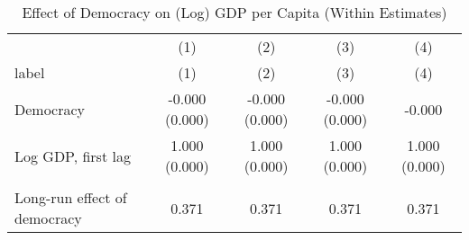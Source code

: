 \begin{table}[!h]
\centering
\caption{\label{tab:tab:fe_main}Effect of Democracy on (Log) GDP per Capita (Within Estimates)}
\centering
\begin{tabular}[t]{lcccc}
\toprule
\multicolumn{1}{c}{ } & \multicolumn{1}{c}{(1)} & \multicolumn{1}{c}{(2)} & \multicolumn{1}{c}{(3)} & \multicolumn{1}{c}{(4)} \\
\cmidrule(l{3pt}r{3pt}){2-2} \cmidrule(l{3pt}r{3pt}){3-3} \cmidrule(l{3pt}r{3pt}){4-4} \cmidrule(l{3pt}r{3pt}){5-5}
label & (1) & (2) & (3) & (4)\\
\midrule
Democracy & -0.000
(0.000) & -0.000
(0.000) & -0.000
(0.000) & -0.000
\cellcolor{gray!10}{(0.000)}\\
Log GDP, first lag & 1.000
(0.000) & 1.000
(0.000) & 1.000
(0.000) & 1.000
(0.000)\\
\cellcolor{gray!10}{p-value, lags 5--8} & \cellcolor{gray!10}{} & \cellcolor{gray!10}{} & \cellcolor{gray!10}{} & \cellcolor{gray!10}{}\\
Long-run effect of democracy & 0.371 & 0.371 & 0.371 & 0.371\\
\bottomrule
\end{tabular}
\end{table}
